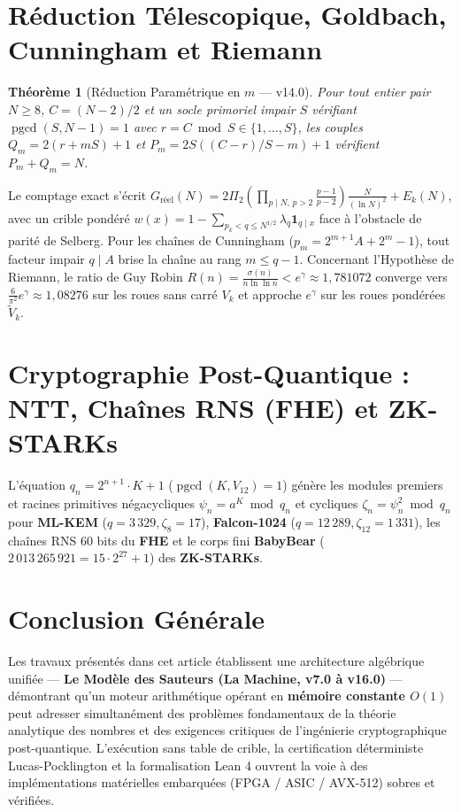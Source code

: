 \documentclass[11pt,a4paper]{article}
\DeclareMathOperator{\pgcd}{pgcd}
\newtheorem{theorem}{Théorème}
\begin{document}
\section{Réduction Télescopique, Goldbach, Cunningham et Riemann}

\begin{theorem}[Réduction Paramétrique en $m$ — v14.0]
Pour tout entier pair $N \geq 8$, $C = (N - 2)/2$ et un socle primoriel impair $S$ vérifiant $\pgcd(S, N - 1) = 1$ avec $r = C \bmod S \in \{1, \dots, S\}$, les couples $Q_m = 2(r + mS) + 1$ et $P_m = 2S((C - r)/S - m) + 1$ vérifient $P_m + Q_m = N$.
\end{theorem}

Le comptage exact s'écrit $G_{\text{réel}}(N) = 2\Pi_2 \left(\prod_{p \mid N,\, p>2} \frac{p-1}{p-2}\right) \frac{N}{(\ln N)^2} + E_k(N)$, avec un crible pondéré $w(x) = 1 - \sum_{p_k < q \leq N^{1/2}} \lambda_q \mathbf{1}_{q \mid x}$ face à l'obstacle de parité de Selberg. Pour les chaînes de Cunningham ($p_m = 2^{m+1} A + 2^m - 1$), tout facteur impair $q \mid A$ brise la chaîne au rang $m \leq q - 1$. Concernant l'Hypothèse de Riemann, le ratio de Guy Robin $R(n) = \frac{\sigma(n)}{n \ln \ln n} < e^\gamma \approx 1{,}781072$ converge vers $\frac{6}{\pi^2} e^\gamma \approx 1{,}08276$ sur les roues sans carré $V_k$ et approche $e^\gamma$ sur les roues pondérées $\widetilde{V}_k$.

\section{Cryptographie Post-Quantique : NTT, Chaînes RNS (FHE) et ZK-STARKs}

L'équation $q_n = 2^{n+1} \cdot K + 1$ ($\pgcd(K, V_{12}) = 1$) génère les modules premiers et racines primitives négacycliques $\psi_n = a^K \bmod q_n$ et cycliques $\zeta_n = \psi_n^2 \bmod q_n$ pour \textbf{ML-KEM} ($q = 3\,329, \zeta_8 = 17$), \textbf{Falcon-1024} ($q = 12\,289, \zeta_{12} = 1\,331$), les chaînes RNS 60 bits du \textbf{FHE} et le corps fini \textbf{BabyBear} ($2\,013\,265\,921 = 15 \cdot 2^{27} + 1$) des \textbf{ZK-STARKs}.

\section{Conclusion Générale}

Les travaux présentés dans cet article établissent une architecture algébrique unifiée — \textbf{Le Modèle des Sauteurs (La Machine, v7.0 à v16.0)} — démontrant qu'un moteur arithmétique opérant en \textbf{mémoire constante $O(1)$} peut adresser simultanément des problèmes fondamentaux de la théorie analytique des nombres et des exigences critiques de l'ingénierie cryptographique post-quantique. L'exécution sans table de crible, la certification déterministe Lucas-Pocklington et la formalisation Lean 4 ouvrent la voie à des implémentations matérielles embarquées (FPGA / ASIC / AVX-512) sobres et vérifiées.
\end{document}

